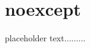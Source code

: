 \newpage
\section[{\tt noexcept}]{{\SecCode noexcept}}\label{noexcept}


placeholder text.........


